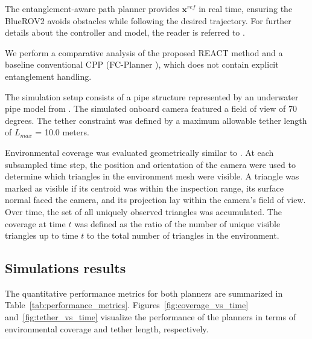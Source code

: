 The entanglement-aware path planner provides $\mathbf{x}^{ref}$ in real time, ensuring the BlueROV2 avoids obstacles while following the desired trajectory. For further details about the controller and model, the reader is referred to \cite{amergp}.

We perform a comparative analysis of the proposed \ac{REACT} method and a baseline conventional \ac{CPP} (FC-Planner \cite{feng2024fc}), which does not contain explicit entanglement handling. 

The simulation setup consists of a pipe structure represented by an underwater pipe model from \cite{feng2024fc}. The simulated onboard camera featured a field of view of 70 degrees. The tether constraint was defined by a maximum allowable tether length of $L_{max}$ = 10.0 meters.

Environmental coverage was evaluated geometrically similar to \cite{amer2023visual}. At each subsampled time step, the position and orientation of the camera were used to determine which triangles in the environment mesh were visible. A triangle was marked as visible if its centroid was within the inspection range, its surface normal faced the camera, and its projection lay within the camera's field of view. Over time, the set of all uniquely observed triangles was accumulated. The coverage at time $t$ was defined as the ratio of the number of unique visible triangles up to time $t$ to the total number of triangles in the environment.


\subsection{Simulations results}

The quantitative performance metrics for both planners are summarized in Table~\ref{tab:performance_metrics}. Figures~\ref{fig:coverage_vs_time} and~\ref{fig:tether_vs_time} visualize the performance of the planners in terms of environmental coverage and tether length, respectively.







\begin{table}[t]
    \centering
    \caption{Performance Metrics Comparison}
    \label{tab:performance_metrics}
    \vspace{0.5em}
\end{table}






